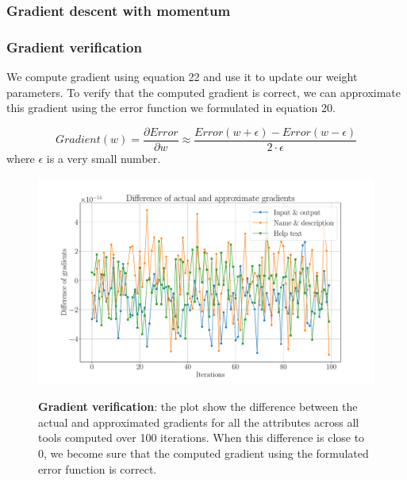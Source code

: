 \subsubsection{Gradient descent with momentum}

\subsubsection{Gradient verification}
We compute gradient using equation 22 and use it to update our weight parameters. To verify that the computed gradient is correct, we can approximate this gradient using the error function we formulated in equation 20.

\begin{equation}
Gradient(w) = \frac{\partial Error}{\partial w} \approx \frac{Error(w + \epsilon) - Error(w - \epsilon)}{2 \cdot \epsilon} 
\end{equation}
where $\epsilon$ is a very small number. 

\begin{figure}[h]
\begin{centering}
    {\includegraphics[scale=0.35]{figures/Difference_gradients.pdf}}
    \caption[Gradient verification]{\textbf{Gradient verification}: the plot show the difference between the actual and approximated gradients for all the attributes across all tools computed over 100 iterations. When this difference is close to 0, we become sure that the computed gradient using the formulated error function is correct.}
\end{centering}
\end{figure}





